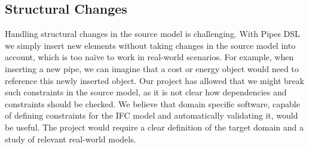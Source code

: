 \subsection{Structural Changes}
Handling structural changes in the source model is challenging. With Pipes DSL we simply insert new elements without taking changes in the source model into account, which is too na\"{i}ve to work in real-world scenarios. For example, when inserting a new pipe, we can imagine that a cost or energy object would need to reference this newly inserted object. Our project has allowed that we might break such constraints in the source model, as it is not clear how dependencies and constraints should be checked. We believe that domain specific software, capable of defining constraints for the IFC model and automatically validating it, would be useful. The project would require a clear definition of the target domain and a study of relevant real-world models.





